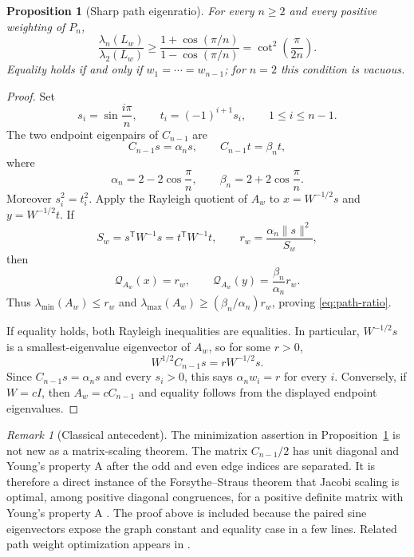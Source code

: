 \documentclass[11pt,reqno]{amsart}
\newtheorem{proposition}[theorem]{Proposition}
\theoremstyle{definition}
\theoremstyle{remark}
\newtheorem{remark}[theorem]{Remark}
\begin{document}
\begin{proposition}[Sharp path eigenratio]\label{prop:path-ratio}
For every $n\ge2$ and every positive weighting of $P_n$,
\begin{equation}\label{eq:path-ratio}
 \frac{\lambda_n(L_w)}{\lambda_2(L_w)}
 \ge\frac{1+\cos(\pi/n)}{1-\cos(\pi/n)}
 =\cot^2\!\left(\frac{\pi}{2n}\right).
\end{equation}
Equality holds if and only if $w_1=\cdots=w_{n-1}$; for $n=2$ this
condition is vacuous.
\end{proposition}

\begin{proof}
Set
\[
 s_i=\sin\frac{i\pi}{n},\qquad
 t_i=(-1)^{i+1}s_i,\qquad 1\le i\le n-1.
\]
The two endpoint eigenpairs of $C_{n-1}$ are
\[
 C_{n-1}s=\alpha_ns,\qquad C_{n-1}t=\beta_nt,
\]
where
\[
 \alpha_n=2-2\cos\frac\pi n,\qquad
 \beta_n=2+2\cos\frac\pi n.
\]
Moreover $s_i^2=t_i^2$.  Apply the Rayleigh quotient of $A_w$ to
$x=W^{-1/2}s$ and $y=W^{-1/2}t$.  If
\[
 S_w=s^{\mathsf T}W^{-1}s=t^{\mathsf T}W^{-1}t,
 \qquad r_w=\frac{\alpha_n\|s\|^2}{S_w},
\]
then
\[
 \mathcal Q_{A_w}(x)=r_w,\qquad
 \mathcal Q_{A_w}(y)=\frac{\beta_n}{\alpha_n}r_w.
\]
Thus
$\lambda_{\min}(A_w)\le r_w$ and
$\lambda_{\max}(A_w)\ge(\beta_n/\alpha_n)r_w$, proving
\eqref{eq:path-ratio}.

If equality holds, both Rayleigh inequalities are equalities.  In
particular, $W^{-1/2}s$ is a smallest-eigenvalue eigenvector of $A_w$, so
for some $r>0$,
\[
 W^{1/2}C_{n-1}s=rW^{-1/2}s.
\]
Since $C_{n-1}s=\alpha_ns$ and every $s_i>0$, this says
$\alpha_nw_i=r$ for every $i$.  Conversely, if $W=cI$, then
$A_w=cC_{n-1}$ and equality follows from the displayed endpoint
eigenvalues.
\end{proof}

\begin{remark}[Classical antecedent]\label{rem:forsythe-straus}
The minimization assertion in Proposition~\ref{prop:path-ratio} is not new
as a matrix-scaling theorem.  The matrix $C_{n-1}/2$ has unit diagonal and
Young's property A after the odd and even edge indices are separated.
It is therefore a direct instance of the Forsythe--Straus theorem that
Jacobi scaling is optimal, among positive diagonal congruences, for a
positive definite matrix with Young's property A
\cite[Theorem~4]{ForsytheStraus1955}.  The proof above is included because
the paired sine eigenvectors expose the graph constant and equality case in
a few lines.  Related path weight optimization appears in
\cite{BoydDiaconisSunXiao2006}.
\end{remark}
\end{document}
